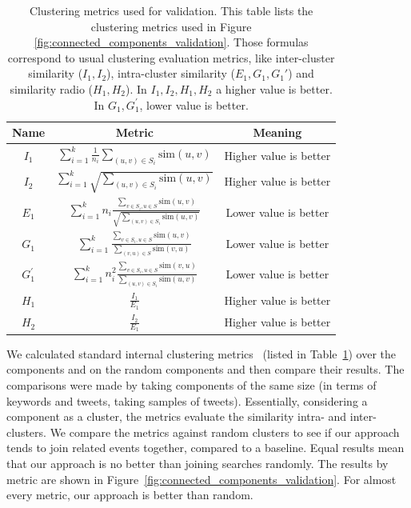 \begin{table}
\centering
\begin{tabular}{| c | c | c |}
\hline
Name & Metric & Meaning \\
\hline
\hline
$I_1$ & $\sum_{i=1}^k \frac{1}{n_i} \sum_{(u,v) \in S_i} \text{sim}(u,v)$ & Higher value is better\\
\hline
$I_2$ & $\sum_{i=1}^k \sqrt{ \sum_{(u,v) \in S_i} \text{sim}(u,v)}$ & Higher value is better \\
\hline
$E_1$ & $\sum_{i=1}^{k} n_i \frac{\sum_{v \in S_i, u \in S} \text{sim}(u,v)}{\sqrt{\sum_{(u,v) \in S_i} \text{sim}(u,v)}}$ & Lower value is better \\
\hline
$G_1$ & $\sum_{i=1}^k \frac{\sum_{v \in S_i, u \in S}\text{sim}(u,v)}{\sum_{(v,u) \in S}\text{sim}(v,u)}$ & Lower value is better \\
\hline
$G_1^{'}$ & $\sum_{i=1}^k n_i^2 \frac{\sum_{v \in S_i, u \in S}\text{sim}(v,u)}{\sum_{(u,v) \in S_i}\text{sim}(u,v)}$ & Lower value is better \\
\hline
$H_1$ & $\frac{I_1}{E_1}$ & Higher value is better \\
\hline
$H_2$ & $\frac{I_2}{E_1}$ & Higher value is better \\
\hline
\end{tabular}
\caption[Clustering metrics used for validation]{Clustering metrics used for
  validation. This table lists the clustering metrics used in Figure
  \ref{fig:connected_components_validation}. Those formulas correspond to usual
  clustering evaluation metrics, like inter-cluster similarity ($I_1, I_2$),
  intra-cluster similarity ($E_1, G_1, G_1'$) and similarity radio ($H_1, H_2$).
  In $I_1, I_2, H_1, H_2$ a higher value is better.  In $G_1, G_1^{'}$, lower
  value is better. }
\label{table:clustering_metrics}
\end{table}

We calculated standard internal clustering metrics~\cite{zhao2001criterion}
(listed in Table~\ref{table:clustering_metrics}) over the components and on the
random components and then compare their results. 
%
The comparisons were made by taking components of the same size (in terms of
keywords and tweets, taking samples of tweets). 
%
Essentially, considering a component as a cluster, the metrics evaluate the
similarity intra- and inter-clusters. 
%
We compare the metrics against random clusters to see if our approach tends to
join related events together, compared to a baseline.
%
Equal results mean that our approach is no better than joining searches
randomly. 
%
The results by metric are shown in
Figure~\ref{fig:connected_components_validation}. For almost every metric, our
approach is better than random.


